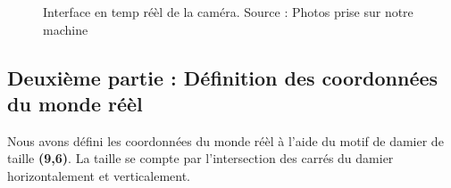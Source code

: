  	\begin{figure}[H]%
 		\center%
 		\setlength{\fboxsep}{5pt}%
 		\setlength{\fboxrule}{0.5pt}%
 		\caption[Interface de la caméra ]{ Interface en temp réèl de la caméra. Source : Photos prise sur notre machine}%
 		\label{fig:Interface de la caméra}
 	\end{figure}
 	
 	\subsection{ Deuxième partie : Définition des coordonnées du monde réèl}
  	
 	Nous avons défini les coordonnées du monde réèl à l'aide du motif de damier de taille \textbf{(9,6)}. La taille se compte par l'intersection des carrés du damier horizontalement et verticalement.
 	
